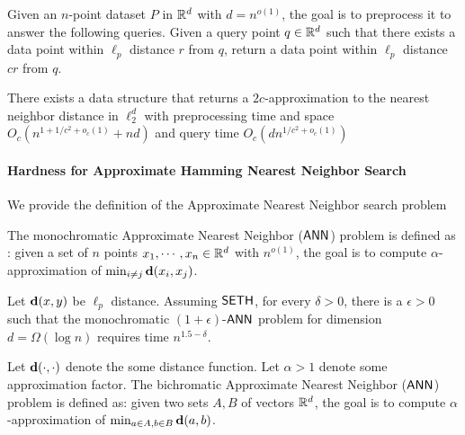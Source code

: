 \begin{problem}
Given an $n$-point dataset $P$ in ${\mathbb R}^d$ with $d = n^{o(1)}$, the goal is to preprocess it to answer the following queries. Given a query point $q \in {\mathbb R}^d$ such that there exists a data point within $\ell_p$ distance $r$ from $q$, return a data point within $\ell_p$ distance $cr$ from $q$.
\end{problem}


\begin{theorem}[\cite{ai06}]\label{thm:l2-ann}
There exists a data structure that returns a $2c$-approximation to the nearest neighbor distance in $\ell_2^d$ with preprocessing time and space $O_c(n^{1+1/c^2+o_c(1)} + nd)$ and query time $O_c(dn^{1/c^2+o_c(1)})$
\end{theorem}

\paragraph*{Hardness for Approximate Hamming Nearest Neighbor Search}

We provide the definition of the Approximate Nearest Neighbor search problem

\begin{problem}\label{pro:single_ANN}
The monochromatic Approximate Nearest Neighbor ($\mathsf{ANN}$) problem is defined as : given a set of $n$ points $x_1, \cdots, x_n \in {\mathbb R}^d$ with $n^{o(1)}$, the goal is to compute $\alpha$-approximation of $\min_{i\neq j} \mathbf{d}(x_i, x_j)$.
\end{problem}

\begin{theorem}[\cite{sm19}]\label{thm:sm19}
Let $\mathbf{d}(x,y)$ be $\ell_p$ distance. Assuming ${\sf SETH}$, for every $\delta > 0$, there is a $\epsilon > 0$ such that the monochromatic $(1+\epsilon)$-${\sf ANN}$ problem for dimension $d = \Omega(\log n)$ requires time $n^{1.5-\delta}$.
\end{theorem}

\begin{problem}\label{pro:hamming_ANN}
Let $\mathbf{d}(\cdot, \cdot)$ denote the some distance function. Let $\alpha > 1$ denote some approximation factor. 
The bichromatic Approximate Nearest Neighbor ($\mathsf{ANN}$) problem is defined as: given two sets $A,B$ of vectors ${\mathbb R}^d$, the goal is to compute $\alpha$-approximation of $\min_{a\in A,b\in B} \mathbf{d}( a , b )$.

\end{problem}


